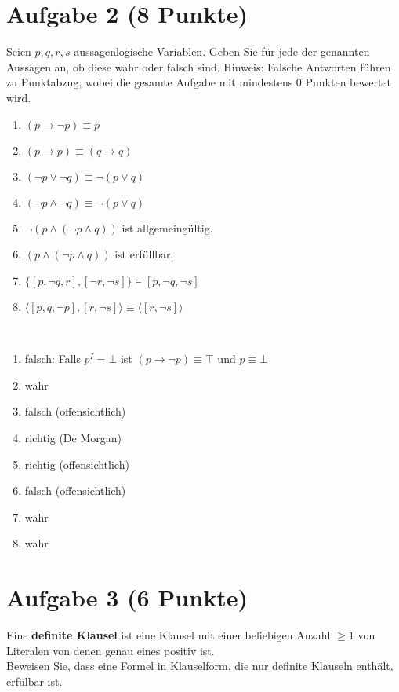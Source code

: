 \section*{Aufgabe 2 (8 Punkte)}
Seien $p,q,r,s$ aussagenlogische Variablen. Geben Sie für jede der genannten Aussagen an, ob diese wahr oder falsch sind.\nl
Hinweis: Falsche Antworten führen zu Punktabzug, wobei die gesamte Aufgabe mit mindestens 0 Punkten bewertet wird.

\begin{enumerate}[label=\alph*)]
\item $(p\to\neg p)\equiv p$
\item $(p\to p)\equiv(q\to q)$
\item $(\neg p\vee\neg q)\equiv \neg(p\vee q)$
\item $(\neg p\wedge\neg q)\equiv \neg(p\vee q)$
\item $\neg(p\wedge(\neg p\wedge q))$ ist allgemeingültig.
\item $(p\wedge(\neg p\wedge q))$ ist erfüllbar.
\item $\big\lbrace[p,\neg q,r],[\neg r,\neg s]\big\rbrace\models[p,\neg q,\neg s]$
\item $\big\langle[p,q,\neg p],[r,\neg s]\big\rangle\equiv\big\langle[r,\neg s]\big\rangle$
\end{enumerate}
\begin{lösung}\
\begin{enumerate}[label=\alph*)]
\item falsch: Falls $p^I=\bot$ ist $(p\to\neg p)\equiv\top$ und $p\equiv\bot$
\item wahr
\item falsch (offensichtlich)
\item richtig (De Morgan)
\item richtig (offensichtlich)
\item falsch (offensichtlich)
\item wahr
\item wahr
\end{enumerate}
\end{lösung}

\section*{Aufgabe 3 (6 Punkte)}
Eine \textbf{definite Klausel} ist eine Klausel mit einer beliebigen Anzahl $\geq1$ von Literalen von denen genau eines positiv ist.\\
Beweisen Sie, dass eine Formel in Klauselform, die nur definite Klauseln enthält, erfülbar ist.

